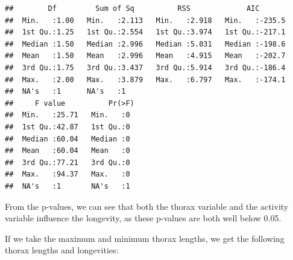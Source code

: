 \documentclass[
]{article}
\begin{document}
\begin{verbatim}
##        Df         Sum of Sq          RSS             AIC        
##  Min.   :1.00   Min.   :2.113   Min.   :2.918   Min.   :-235.5  
##  1st Qu.:1.25   1st Qu.:2.554   1st Qu.:3.974   1st Qu.:-217.1  
##  Median :1.50   Median :2.996   Median :5.031   Median :-198.6  
##  Mean   :1.50   Mean   :2.996   Mean   :4.915   Mean   :-202.7  
##  3rd Qu.:1.75   3rd Qu.:3.437   3rd Qu.:5.914   3rd Qu.:-186.4  
##  Max.   :2.00   Max.   :3.879   Max.   :6.797   Max.   :-174.1  
##  NA's   :1      NA's   :1                                       
##     F value          Pr(>F) 
##  Min.   :25.71   Min.   :0  
##  1st Qu.:42.87   1st Qu.:0  
##  Median :60.04   Median :0  
##  Mean   :60.04   Mean   :0  
##  3rd Qu.:77.21   3rd Qu.:0  
##  Max.   :94.37   Max.   :0  
##  NA's   :1       NA's   :1
\end{verbatim}

From the p-values, we can see that both the thorax variable and the
activity variable influence the longevity, as these p-values are both
well below 0.05.

If we take the maximum and minimum thorax lengths, we get the following
thorax lengths and longevities:
\end{document}
